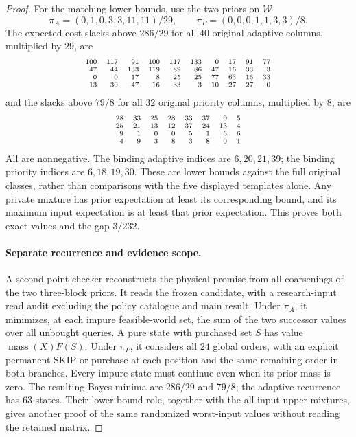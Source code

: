 \begin{proof}
For the matching lower bounds, use the two priors on $\mathcal W$
\[
 \pi_A=(0,1,0,3,3,11,11)/29,\qquad
 \pi_P=(0,0,0,1,1,3,3)/8.
\]
The expected-cost slacks above $286/29$ for all $40$ original adaptive
columns, multiplied by $29$, are
\[
 \scriptsize
 \begin{array}{rrrrrrrrrr}
 100 & 117 & 91 & 100 & 117 & 133 & 0 & 17 & 91 & 77 \\
 47 & 44 & 133 & 119 & 89 & 86 & 47 & 16 & 33 & 3 \\
 0 & 0 & 17 & 8 & 25 & 25 & 77 & 63 & 16 & 33 \\
 13 & 30 & 47 & 16 & 33 & 3 & 10 & 27 & 27 & 0
 \end{array}
\]
and the slacks above $79/8$ for all $32$ original priority columns,
multiplied by $8$, are
\[
 \scriptsize
 \begin{array}{rrrrrrrr}
 28 & 33 & 25 & 28 & 33 & 37 & 0 & 5 \\
 25 & 21 & 13 & 12 & 37 & 24 & 13 & 4 \\
 9 & 1 & 0 & 0 & 5 & 1 & 6 & 6 \\
 4 & 9 & 3 & 8 & 3 & 8 & 0 & 1
 \end{array}
\]
All are nonnegative. The binding adaptive indices are $6,20,21,39$;
the binding priority indices are $6,18,19,30$. These are lower bounds
against the full original classes, rather than comparisons with the
five displayed templates alone. Any private mixture has prior expectation
at least its corresponding bound, and its maximum input expectation
is at least that prior expectation. This proves both exact values and
the gap $3/232$.

\paragraph*{Separate recurrence and evidence scope.}
A second point checker reconstructs the physical promise from all
coarsenings of the two three-block priors. It reads the frozen candidate,
with a research-input read audit excluding the policy catalogue and main
result. Under $\pi_A$, it minimizes, at each impure feasible-world set,
the sum of the two successor values over all unbought queries. A pure
state with purchased set $S$ has value $\operatorname{mass}(X)F(S)$.
Under $\pi_P$, it considers all $24$ global orders, with an explicit
permanent SKIP or purchase at each position and the same remaining order
in both branches. Every impure state must continue even when its prior
mass is zero. The resulting Bayes minima are $286/29$ and $79/8$;
the adaptive recurrence has $63$ states. Their lower-bound role, together
with the all-input upper mixtures, gives another proof of the same
randomized worst-input values without reading the retained matrix.


\end{proof}

